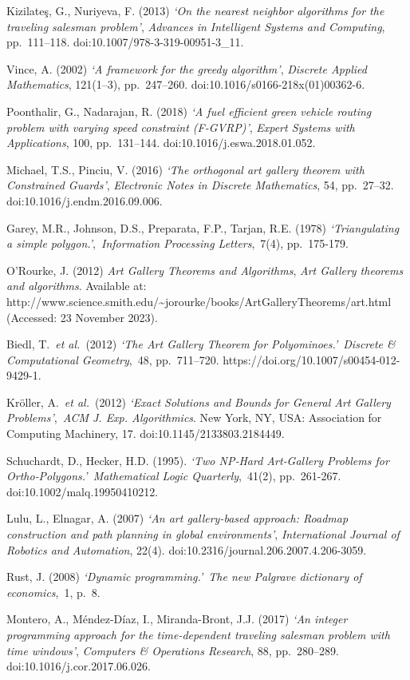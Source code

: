 \documentclass[
]{article}
\begin{document}
Kizilateş, G., Nuriyeva, F. (2013) \emph{`On the nearest neighbor
algorithms for the traveling salesman problem'}, \emph{Advances in
Intelligent Systems and Computing}, pp.~111--118.
doi:10.1007/978-3-319-00951-3\_11.

Vince, A. (2002) \emph{`A framework for the greedy algorithm'},
\emph{Discrete Applied Mathematics}, 121(1--3), pp.~247--260.
doi:10.1016/s0166-218x(01)00362-6.

Poonthalir, G., Nadarajan, R. (2018) \emph{`A fuel efficient green
vehicle routing problem with varying speed constraint (F-GVRP)'},
\emph{Expert Systems with Applications}, 100, pp.~131--144.
doi:10.1016/j.eswa.2018.01.052.

Michael, T.S., Pinciu, V. (2016) \emph{`The orthogonal art gallery
theorem with Constrained Guards'}, \emph{Electronic Notes in Discrete
Mathematics}, 54, pp.~27--32. doi:10.1016/j.endm.2016.09.006.

Garey, M.R., Johnson, D.S., Preparata, F.P., Tarjan, R.E. (1978)
\emph{`Triangulating a simple polygon.'},~\emph{Information Processing
Letters},~7(4), pp.~175-179.

O'Rourke, J. (2012) \emph{Art Gallery Theorems and Algorithms},
\emph{Art Gallery theorems and algorithms}. Available at:
http://www.science.smith.edu/\textasciitilde jorourke/books/ArtGalleryTheorems/art.html
(Accessed: 23 November 2023).

Biedl, T.~\emph{et al.}~(2012) \emph{`The Art Gallery Theorem for
Polyominoes.'}~\emph{Discrete \& Computational Geometry},~48,
pp.~711--720. https://doi.org/10.1007/s00454-012-9429-1.

Kröller, A.~\emph{et al.}~(2012) \emph{`Exact Solutions and Bounds for
General Art Gallery Problems'},~\emph{ACM J. Exp. Algorithmics}. New
York, NY, USA: Association for Computing Machinery, 17.
doi:10.1145/2133803.2184449.

Schuchardt, D., Hecker, H.D. (1995). \emph{`Two NP‐Hard Art‐Gallery
Problems for Ortho‐Polygons.'}~\emph{Mathematical Logic
Quarterly},~41(2), pp.~261-267. doi:10.1002/malq.19950410212.

Lulu, L., Elnagar, A. (2007) \emph{`An art gallery-based approach:
Roadmap construction and path planning in global environments'},
\emph{International Journal of Robotics and Automation}, 22(4).
doi:10.2316/journal.206.2007.4.206-3059.

Rust, J. (2008) \emph{`Dynamic programming.'}~\emph{The new Palgrave
dictionary of economics},~1, p.~8.

Montero, A., Méndez-Díaz, I., Miranda-Bront, J.J. (2017) \emph{`An
integer programming approach for the time-dependent traveling salesman
problem with time windows'}, \emph{Computers \& Operations Research},
88, pp.~280--289. doi:10.1016/j.cor.2017.06.026.
\end{document}
